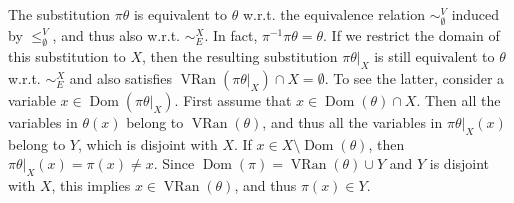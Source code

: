 \documentclass[10pt,a4paper]{amsart}
\begin{document}
 
 
The substitution $\pi\theta$ is equivalent to $\theta$ w.r.t. the equivalence relation $\sim_{\emptyset}^{V}$ induced by $\leq_{\emptyset}^{V}$, and thus also w.r.t. $\sim_{E}^{X}$. In fact, $\pi^{-1}\pi\theta=\theta$. If we restrict the domain of this substitution to $X$, then the resulting substitution $\pi\theta|_{X}$ is still equivalent to $\theta$ w.r.t. $\sim_{E}^{X}$ and also satisfies $\operatorname{VRan}(\pi\theta|_{X})\cap X=\emptyset$. To see the latter, consider a variable $x\in\operatorname{Dom}(\pi\theta|_{X})$. First assume that $x\in\operatorname{Dom}(\theta)\cap X$. Then all the variables in $\theta(x)$ belong to $\operatorname{VRan}(\theta)$, and thus all the variables in $\pi\theta|_{X}(x)$ belong to $Y$, which is disjoint with $X$. If $x\in X\setminus\operatorname{Dom}(\theta)$, then $\pi\theta|_{X}(x)=\pi(x)\neq x$. Since $\operatorname{Dom}(\pi)=\operatorname{VRan}(\theta)\cup Y$ and $Y$ is disjoint with $X$, this implies $x\in\operatorname{VRan}(\theta)$, and thus $\pi(x)\in Y$.\par
 
 
 
\end{document}
